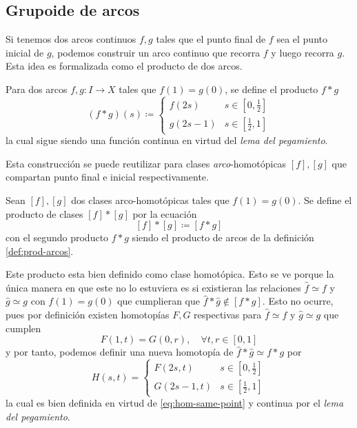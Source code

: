 \subsection{Grupoide de arcos}
Si tenemos dos arcos continuos \(f,g\) tales que el punto final de \(f\)
sea el punto inicial de \(g\), podemos construir un arco continuo que
recorra \(f\) y luego recorra \(g\). Esta idea es formalizada como
el producto de dos arcos.

\begin{definicion} \label{def:prod-arcos}
Para dos arcos \(f,g : I \to X\) tales que
\(f(1) = g(0)\), se define el producto \(f * g \)
\[ (f*g) (s) \coloneqq \begin{cases}
    f(2s) & s \in [0,\frac{1}{2}] \\
    g(2s - 1) & s \in [\frac{1}{2} , 1]
  \end{cases}
\]
la cual sigue siendo una función continua en virtud del \emph{lema del
pegamiento}.
\end{definicion}

Esta construcción se puede reutilizar para clases
\emph{arco}-homotópicas \([f],[g]\) que compartan punto final e inicial
respectivamente.
\begin{definicion}
  Sean \([f],[g]\) dos clases arco-homotópicas tales que \( f(1) =
  g(0)\). Se define el producto de clases \([f] * [g]\) por la ecuación
  \[ [f] * [g] \coloneqq [f * g] \]
  con el segundo producto \(f * g\) siendo el producto de arcos de la
  definición \ref{def:prod-arcos}.
\end{definicion}
\begin{acotacion}
  Este producto esta bien definido como clase homotópica. Esto se ve
  porque la única manera en que este no lo estuviera es si existieran las
  relaciones \(\hat f \simeq f\) y \(\hat g \simeq g\) con \(f(1) = g(0)\)
  que cumplieran que \(\hat f * \hat g \not \in [f * g]\). Esto no ocurre,
  pues por definición existen homotopías \(F,G\) respectivas para \(\hat f
  \simeq f\) y \(\hat g \simeq g\) que cumplen
  \begin{equation}
  F(1,t) = G(0,r) , \quad \forall t,r \in [0,1] \label{eq:hom-same-point}
  \end{equation}
  y por tanto, podemos definir una nueva homotopía de \(\hat f * \hat
  g \simeq f * g\) por
  \[
    H(s,t) = \begin{cases}
      F(2s,t) & s \in [0, \frac{1}{2}] \\
      G(2s - 1, t) & s \in [\frac{1}{2} , 1]
    \end{cases}
  \]
  la cual es bien definida en virtud de \eqref{eq:hom-same-point} y
  continua por el \emph{lema del pegamiento}.
\end{acotacion}

